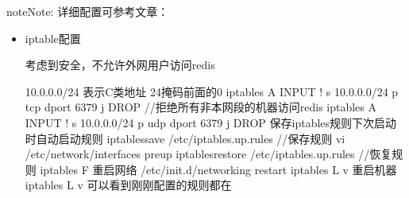 \documentclass[a4paper,10pt,english]{sphinxmanual}
\begin{document}
\begin{sphinxadmonition}{note}{Note:}
详细配置可参考文章：
\end{sphinxadmonition}
\begin{itemize}
\item {} 
iptable配置

\begin{sphinxVerbatim}[commandchars=\\\{\}]
考虑到安全，不允许外网用户访问redis

10.0.0.0/24 表示C类地址 24掩码前面的0
iptables \PYGZhy{}A INPUT ! \PYGZhy{}s 10.0.0.0/24 \PYGZhy{}p tcp \PYGZhy{}\PYGZhy{}dport 6379 \PYGZhy{}j DROP //拒绝所有非本网段的机器访问redis
iptables \PYGZhy{}A INPUT ! \PYGZhy{}s 10.0.0.0/24 \PYGZhy{}p udp \PYGZhy{}\PYGZhy{}dport 6379 \PYGZhy{}j DROP
保存iptables规则下次启动时自动启动规则
iptables\PYGZhy{}save \PYGZgt{} /etc/iptables.up.rules //保存规则
vi /etc/network/interfaces
pre\PYGZhy{}up iptables\PYGZhy{}restore \PYGZlt{} /etc/iptables.up.rules  //恢复规则
iptables \PYGZhy{}F
重启网络
/etc/init.d/networking restart
iptables \PYGZhy{}L \PYGZhy{}v
重启机器
iptables \PYGZhy{}L \PYGZhy{}v
可以看到刚刚配置的规则都在
\end{sphinxVerbatim}

\end{itemize}
\end{document}
